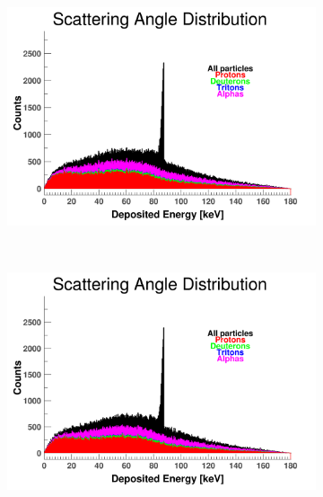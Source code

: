 \documentclass[10pt,a4paper]{report}
\begin{document}
\begin{figure}[htbp]
    \begin{subfigure}[htbp]{0.42\textwidth}
        \label{fig:A5}
        \includegraphics[width=\textwidth]{./A5_QGSP_BIC_HP_Scat.png}
    \end{subfigure}
    ~ 
    \begin{subfigure}[htbp]{0.42\textwidth} 
        \label{fig:A6}
        \includegraphics[width=\textwidth]{./A6_QBBC_Scat.png}
    \end{subfigure}
    
    \vspace{1mm}
    

\end{figure}
\end{document}

